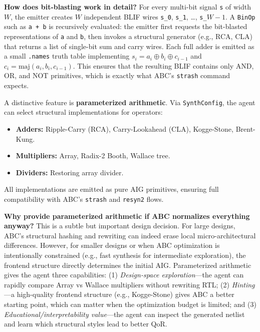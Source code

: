 \documentclass[11pt]{article}
\begin{document}
\textbf{How does bit-blasting work in detail?} For every multi-bit signal \texttt{s} of width $W$, the emitter creates $W$ independent BLIF wires \texttt{s\_0}, \texttt{s\_1}, \dots, \texttt{s\_\(W-1\)}. A \texttt{BinOp} such as \texttt{a + b} is recursively evaluated: the emitter first requests the bit-blasted representations of \texttt{a} and \texttt{b}, then invokes a structural generator (e.g., RCA, CLA) that returns a list of single-bit sum and carry wires. Each full adder is emitted as a small \texttt{.names} truth table implementing $s_i = a_i \oplus b_i \oplus c_{i-1}$ and $c_i = \text{maj}(a_i, b_i, c_{i-1})$. This ensures that the resulting BLIF contains only AND, OR, and NOT primitives, which is exactly what ABC's \texttt{strash} command expects.

A distinctive feature is \textbf{parameterized arithmetic}. Via \texttt{SynthConfig}, the agent can select structural implementations for operators:

\begin{itemize}
    \item \textbf{Adders:} Ripple-Carry (RCA), Carry-Lookahead (CLA), Kogge-Stone, Brent-Kung.
    \item \textbf{Multipliers:} Array, Radix-2 Booth, Wallace tree.
    \item \textbf{Dividers:} Restoring array divider.
\end{itemize}

All implementations are emitted as pure AIG primitives, ensuring full compatibility with ABC's \texttt{strash} and \texttt{resyn2} flows.

\textbf{Why provide parameterized arithmetic if ABC normalizes everything anyway?} This is a subtle but important design decision. For large designs, ABC's structural hashing and rewriting can indeed erase local micro-architectural differences. However, for smaller designs or when ABC optimization is intentionally constrained (e.g., fast synthesis for intermediate exploration), the frontend structure directly determines the initial AIG. Parameterized arithmetic gives the agent three capabilities: (1) \textit{Design-space exploration}---the agent can rapidly compare Array vs Wallace multipliers without rewriting RTL; (2) \textit{Hinting}---a high-quality frontend structure (e.g., Kogge-Stone) gives ABC a better starting point, which can matter when the optimization budget is limited; and (3) \textit{Educational/interpretability value}---the agent can inspect the generated netlist and learn which structural styles lead to better QoR.
\end{document}
